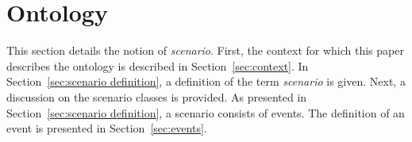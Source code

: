 \section{Ontology}
\label{sec:ontology}

This section details the notion of \emph{scenario}. First, the context for which this paper describes the ontology is described in Section~\ref{sec:context}. In Section~\ref{sec:scenario definition}, a definition of the term \emph{scenario} is given. Next, a discussion on the scenario classes is provided. As presented in Section~\ref{sec:scenario definition}, a scenario consists of events. The definition of an event is presented in Section~\ref{sec:events}.






